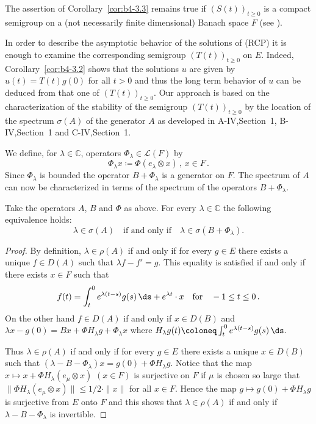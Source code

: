 The assertion of Corollary~\ref{cor:b4-3.3} remains true if $(S(t))_{t \geq 0}$ is a compact semigroup on a (not necessarily finite dimensional) Banach space $F$ (see \citet{traviswebb:1974}).

In order to describe the asymptotic behavior of the solutions of (RCP) it is enough to examine the corresponding semigroup $(T(t))_{t \geq 0}$ on $E$. Indeed, Corollary~\ref{cor:b4-3.2} shows that the solutions $u$ are given by $u(t) = T(t)g(0)$ for all $t > 0$ and thus the long term behavior of $u$ can be deduced from that one of $(T(t))_{t \geq 0}$. Our approach is based on the characterization of the stability of the semigroup $(T(t))_{t \geq 0}$ by the location of the spectrum $\sigma(A)$ of the generator $A$ as developed in A-IV,Section~1, B-IV,Section~1 and C-IV,Section~1.

We define, for $\lambda \in \mathbb{C}$, operators $\Phi_\lambda \in \mathcal{L}(F)$ by
\begin{equation}\label{eq:b4-3.3}
	\Phi_\lambda x  \coloneq  \Phi(e_\lambda \otimes x) \, , \, x \in F \, .
\end{equation}
Since $\Phi_\lambda$ is bounded the operator $B + \Phi_\lambda$ is a generator on $F$. The spectrum of $A$ can now be characterized in terms of the spectrum of the operators $B + \Phi_\lambda$.
%
%
%
\newpage
%
\begin{proposition}\label{prop:b4-3.4}
	Take the operators $A$, $B$ and $\Phi$ as above. For every $\lambda \in \mathbb{C}$ the following equivalence holds:
	\begin{equation}\label{eq:b4-3.4}
		\lambda \in \sigma(A) \quad \text{if and only if} \quad \lambda \in \sigma(B + \Phi_\lambda).
	\end{equation}
\end{proposition}

\begin{proof} By definition, $\lambda \in \rho(A)$ if and only if for every $g \in E$ there exists a unique $f \in D(A)$ such that $\lambda f - f' = g$. This equality is satisfied if and only if there exists $x \in F$ such that
\[
f(t) = \int_t^0 e^{\lambda(t-s)} g(s) \,\ds + e^{\lambda t} \cdot x \quad \text{for} \quad -1 \leq t \leq 0  \,.
\]
On the other hand $f \in D(A)$ if and only if $x \in D(B)$ and $\lambda x - g(0) = Bx + \Phi H_\lambda g + \Phi_\lambda x$ where $H_\lambda g(t) \coloneq  \int_t^0 e^{\lambda(t-s)} g(s) \,\ds \text{.}$

Thus $\lambda \in \rho(A)$ if and only if for every $g \in E$ there exists a unique $x \in D(B)$ such that $(\lambda - B - \Phi_\lambda)x = g(0) + \Phi H_\lambda g$. Notice that the map $x \mapsto x + \Phi H_\lambda(e_\mu \otimes x)$ $(x \in F)$ is surjective on $F$ if $\mu$ is chosen so large that $\|\Phi H_\lambda(e_\mu \otimes x)\| \leq 1/2 \cdot \|x\|$ for all $x \in F$. Hence the map $g \mapsto g(0) + \Phi H_\lambda g$ is surjective from $E$ onto $F$ and this shows that $\lambda \in \rho(A)$ if and only if $\lambda - B - \Phi_\lambda$ is invertible.
\end{proof}


